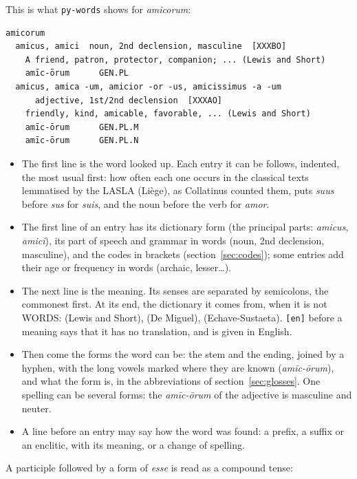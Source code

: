 \documentclass[12pt,
              article,
              oneside
              ]{memoir}
\begin{document}
%
This is what \texttt{py-words} shows for \textit{amicorum}:

\begin{verbatim}
amicorum
  amicus, amici  noun, 2nd declension, masculine  [XXXBO]
    A friend, patron, protector, companion; ... (Lewis and Short)
    amīc-ōrum      GEN.PL
  amicus, amica -um, amicior -or -us, amicissimus -a -um
      adjective, 1st/2nd declension  [XXXAO]
    friendly, kind, amicable, favorable, ... (Lewis and Short)
    amīc-ōrum      GEN.PL.M
    amīc-ōrum      GEN.PL.N
\end{verbatim}

%
\begin{itemize}
\item The first line is the word looked up. Each entry it can be follows,
  indented, the most usual first: how often each one occurs in the
  classical texts lemmatised by the LASLA (Liège), as Collatinus counted
  them, puts \textit{suus} before \textit{sus} for \textit{suis}, and the
  noun before the verb for \textit{amor}.
\item The first line of an entry has its dictionary form (the principal
  parts: \textit{amicus, amici}), its part of speech and grammar in words
  (noun, 2nd declension, masculine), and the codes in brackets
  (section~\ref{sec:codes}); some entries add their age or frequency in
  words (archaic, lesser\ldots).
\item The next line is the meaning. Its senses are separated by
  semicolons, the commonest first. At its end, the dictionary it comes
  from, when it is not WORDS: (Lewis and Short), (De Miguel),
  (Echave-Sustaeta). \texttt{[en]} before a meaning says that it has no
  translation, and is given in English.
\item Then come the forms the word can be: the stem and the ending,
  joined by a hyphen, with the long vowels marked where they are known
  (\textit{amīc-ōrum}), and what the form is, in the abbreviations of
  section~\ref{sec:glosses}. One spelling can be several forms: the
  \textit{amīc-ōrum} of the adjective is masculine and neuter.
\item A line before an entry may say how the word was found: a prefix, a
  suffix or an enclitic, with its meaning, or a change of spelling.
\end{itemize}

\noindent{}%
A participle followed by a form of \textit{esse} is read as a compound
tense:
\end{document}
